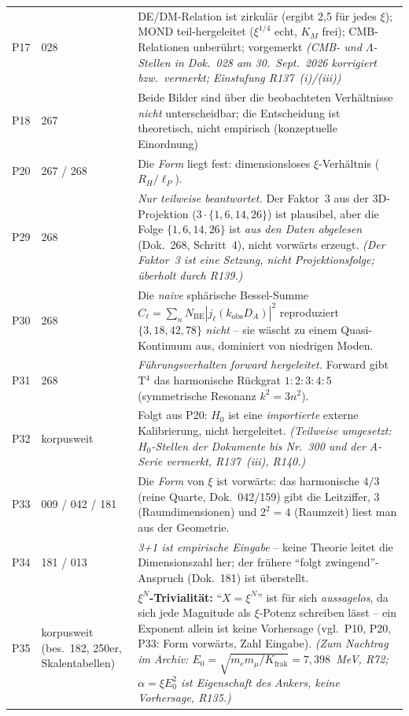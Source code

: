 \begin{longtable}{@{}p{0.9cm}p{3.1cm}p{10.2cm}@{}}
P17 & 028 & DE/DM-Relation ist zirkulär (ergibt 2,5 für jedes $\xi$); MOND teil-hergeleitet ($\xi^{1/4}$ echt, $K_M$ frei); CMB-Relationen unberührt; vorgemerkt \emph{(CMB- und $\Lambda$-Stellen in Dok.~028 am 30.~Sept.~2026 korrigiert bzw.\ vermerkt; Einstufung R137~(i)/(iii))} \\
P18 & 267 & Beide Bilder sind über die beobachteten Verhältnisse \emph{nicht} unterscheidbar; die Entscheidung ist theoretisch, nicht empirisch (konzeptuelle Einordnung) \\
P20 & 267 / 268 & Die \emph{Form} liegt fest: dimensionsloses $\xi$-Verhältnis ($R_H/\ell_P$). \\
P29 & 268 & \emph{Nur teilweise beantwortet.} Der Faktor~3 aus der 3D-Projektion ($3\cdot\{1,6,14,26\}$) ist plausibel, aber die Folge $\{1,6,14,26\}$ ist \emph{aus den Daten abgelesen} (Dok.~268, Schritt~4), nicht vorwärts erzeugt. \emph{(Der Faktor~3 ist eine Setzung, nicht Projektionsfolge; überholt durch R139.)} \\
P30 & 268 & Die \emph{naive} sphärische Bessel-Summe $C_\ell=\sum_n N_\mathrm{BE}|j_\ell(k_\mathrm{obs}D_A)|^2$ reproduziert $\{3,18,42,78\}$ \emph{nicht} -- sie wäscht zu einem Quasi-Kontinuum aus, dominiert von niedrigen Moden. \\
P31 & 268 & \emph{Führungsverhalten forward hergeleitet.} Forward gibt T$^4$ das harmonische Rückgrat $1:2:3:4:5$ (symmetrische Resonanz $k^2=3n^2$). \\
P32 & korpusweit & Folgt aus P20: $H_0$ ist eine \emph{importierte} externe Kalibrierung, nicht hergeleitet. \emph{(Teilweise umgesetzt: $H_0$-Stellen der Dokumente bis Nr.~300 und der A-Serie vermerkt, R137~(iii), R140.)} \\
P33 & 009 / 042 / 181 & Die \emph{Form} von $\xi$ ist vorwärts: das harmonische $4/3$ (reine Quarte, Dok.~042/159) gibt die Leitziffer, $3$ (Raumdimensionen) und $2^2{=}4$ (Raumzeit) liest man aus der Geometrie. \\
P34 & 181 / 013 & \emph{3+1 ist empirische Eingabe} -- keine Theorie leitet die Dimensionszahl her; der frühere \enquote{folgt zwingend}-Anspruch (Dok.~181) ist überstellt. \\
P35 & korpusweit (bes.\ 182, 250er, Skalentabellen) & \textbf{$\xi^N$-Trivialität:} \enquote{$X = \xi^N$} ist für sich \emph{aussagelos}, da sich jede Magnitude als $\xi$-Potenz schreiben lässt -- ein Exponent allein ist keine Vorhersage (vgl.\ P10, P20, P33: Form vorwärts, Zahl Eingabe). \emph{(Zum Nachtrag im Archiv: $E_0=\sqrt{m_em_\mu/K_{\mathrm{frak}}}=7{,}398$~MeV, R72; $\alpha=\xi E_0^2$ ist Eigenschaft des Ankers, keine Vorhersage, R135.)} \\

\end{longtable}
